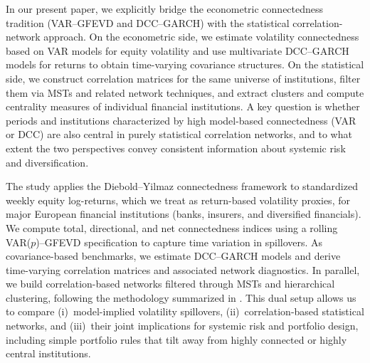 
In our present paper, we explicitly bridge the econometric connectedness tradition (VAR--GFEVD and
DCC--GARCH) with the statistical correlation-network approach. On the econometric side,
we estimate volatility connectedness based on VAR models for equity volatility and use
multivariate DCC--GARCH models for returns to obtain time-varying covariance structures.
On the statistical side, we construct correlation matrices for the same universe of
institutions, filter them via MSTs and related network techniques, and extract clusters
and compute centrality measures of individual financial institutions.%
A key
question is whether periods and institutions characterized by high model-based
connectedness (VAR or DCC) are also central in purely statistical correlation networks,
and to what extent the two perspectives convey consistent information about systemic risk
and diversification.


The study applies the Diebold--Yilmaz connectedness framework to standardized weekly
equity log-returns, which we treat as return-based volatility proxies, for major European
financial institutions (banks, insurers, and diversified financials). We compute total,
directional, and net connectedness indices using a rolling VAR($p$)--GFEVD specification
to capture time variation in spillovers. As covariance-based benchmarks, we estimate
DCC--GARCH models and derive time-varying correlation matrices and associated network
diagnostics. In parallel, we build correlation-based networks filtered through MSTs and
hierarchical clustering, following the methodology summarized in \citet{MartiEtAl2020}.
This dual setup allows us to compare (i)~model-implied volatility spillovers,
(ii)~correlation-based statistical networks, and (iii)~their joint implications for
systemic risk and portfolio design, including simple portfolio rules that tilt away from
highly connected or highly central institutions.


